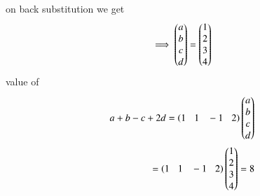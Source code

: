 \documentclass[journal]{IEEEtran}
\begin{document}
        on back substitution we get
        \begin{align}
        \implies \begin{pmatrix}a\\b\\c\\d\end{pmatrix}=\begin{pmatrix}1\\2\\3\\4\end{pmatrix}
\end{align}
    value of 
    \begin{align}
    a+b-c+2d=    \left(1\hspace{0.3cm}1\hspace{0.3cm}-1\hspace{0.3cm}2\right)\begin{pmatrix}a\\b\\c\\d\end{pmatrix}\\=\left(1\hspace{0.3cm}1\hspace{0.3cm}-1\hspace{0.3cm}2\right)\begin{pmatrix}1\\2\\3\\4\end{pmatrix}=8
    \end{align}
\end{document}
